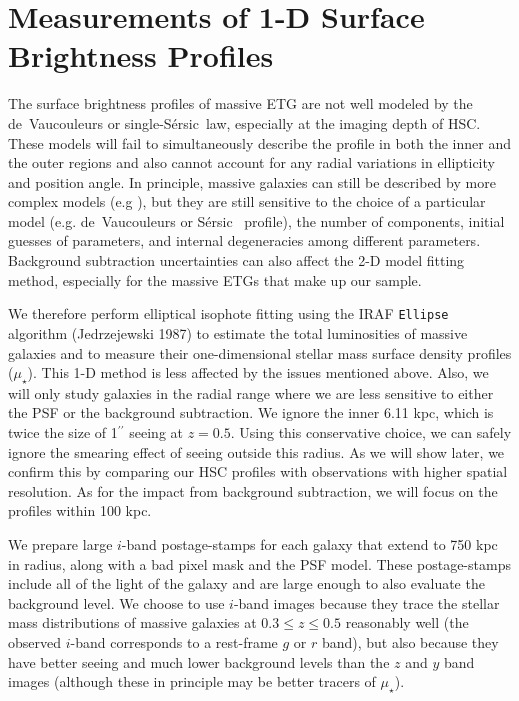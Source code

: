 \documentclass[a4paper,fleqn,usenatbib]{mnras}
\def\asec{$^{\prime\prime}$}
\def\ser{{S\'{e}rsic\ }}
\def\mden{{$\mu_{\star}$}}
\begin{document}
\section{Measurements of 1-D Surface Brightness Profiles}
    \label{sec:ellipse}
    
    The surface brightness profiles of massive ETG are not well modeled by the 
    de~Vaucouleurs or single-\ser law, especially at the imaging depth of HSC.
    These models will fail to simultaneously describe the profile in both the inner 
    and the outer regions and also cannot account for any radial variations in 
    ellipticity and position angle. 
    In principle, massive galaxies can still be described by more complex 
    models (e.g \citealt{Huang2013a, Huang2013b, Oh2017}), but they are still 
    sensitive to the choice of a particular model (e.g. de~Vaucouleurs or \ser{} 
    profile), the number of components, initial guesses of parameters, and internal 
    degeneracies among different parameters. 
    Background subtraction uncertainties can also affect the 2-D model fitting method, 
    especially for the massive ETGs that make up our sample. 
    
    We therefore perform elliptical isophote fitting using the IRAF \texttt{Ellipse} 
    algorithm (Jedrzejewski 1987) to estimate the total luminosities of massive 
    galaxies and to measure their one-dimensional stellar mass surface 
    density profiles (\mden{}). 
    This 1-D method is less affected by the issues mentioned above. 
    Also, we will only study galaxies in the radial range where we are less 
    sensitive to either the PSF or the background subtraction.
    We ignore the inner 6.11 kpc, which is twice the size of 1\asec{} seeing at 
    $z=0.5$.
    Using this conservative choice, we can safely ignore the smearing effect of 
    seeing outside this radius.
    As we will show later, we confirm this by comparing our HSC profiles with 
    observations with higher spatial resolution. 
    As for the impact from background subtraction, we will focus on the profiles 
    within 100 kpc. 
        
    We prepare large $i$-band postage-stamps for each galaxy that extend to 750 kpc 
    in radius, along with a bad pixel mask and the PSF model. 
    These postage-stamps include all of the light of the galaxy and are large enough 
    to also evaluate the background level. We choose to use $i$-band images because 
    they trace the stellar mass distributions of massive galaxies at 
    $0.3 \leq z \leq 0.5$ reasonably well 
    (the observed $i$-band corresponds to a rest-frame $g$ or $r$ band), but also 
    because they have better seeing and much lower background levels than the $z$ 
    and $y$ band images (although these in principle may be better tracers of 
    \mden{}). 
    
\end{document}
